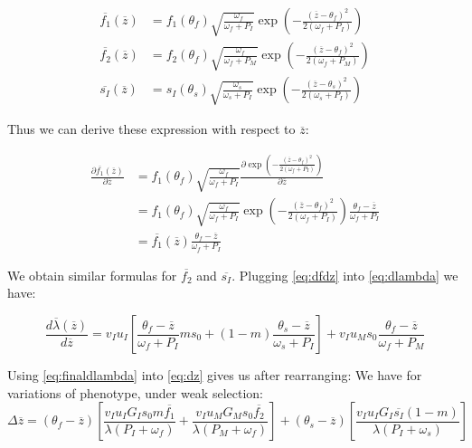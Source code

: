 \begin{subequations}
	\begin{align}
	\label{eq:meanf}
		\overline{f_{1}}(\overline{z}) &= f_{1}(\theta_{f}) \sqrt{\frac{\omega_{f}}{\omega_{f} + P_{I}}} \exp\left(-\frac{(\overline{z}-\theta_{f})^2}{2(\omega_{f}+P_{I})}\right) \\
		\overline{f_{2}}(\overline{z}) &= f_{2}(\theta_{f}) \sqrt{\frac{\omega_{f}}{\omega_{f} + P_{M}}} \exp\left(-\frac{(\overline{z}-\theta_{f})^2}{2(\omega_{f}+P_{M})}\right) \\
		\overline{s_{I}}(\overline{z}) &= s_{I}(\theta_{s}) \sqrt{\frac{\omega_{s}}{\omega_{s} + P_{I}}} \exp\left(-\frac{(\overline{z}-\theta_{s})^2}{2(\omega_{s}+P_{I})}\right)
	\end{align}
\end{subequations}

Thus we can derive these expression with respect to $\overline{z}$:

\begin{align}
	\label{eq:dfdz}
	\frac{\partial \overline{f_{1}}(\overline{z}) }{ \partial \overline{z} } &= f_{1}(\theta_{f}) \sqrt{\frac{\omega_{f}}{\omega_{f} + P_{I}}} \frac{\partial \exp \left(-\frac{(\overline{z}-\theta_{f})^2}{2(\omega_{f}+P_{I})}\right)}{\partial\overline{z}} \nonumber \\
	&= f_{1}(\theta_{f}) \sqrt{ \frac{\omega_{f}}{ \omega_{f} + P_{I}}}\exp\left(-\frac{(\overline{z}-\theta_{f})^2}{2(\omega_{f}+P_{I})}\right) \frac{\theta_{f} - \overline{z}}{\omega_{f} + P_{I}} \nonumber \\
	&= \overline{f_{1}}(\overline{z}) \frac{\theta_{f} - \overline{z}}{\omega_{f} + P_{I}}
\end{align}

We obtain similar formulas for $\overline{f_{2}}$ and $\overline{s_{I}}$. Plugging \eqref{eq:dfdz} into \eqref{eq:dlambda} we have:

\begin{equation}
	\label{eq:finaldlambda}
	\frac{d\overline{\lambda}(\overline{z})}{d\overline{z}} = v_{I} u_{I} \left[ \frac{\theta_{f} - \overline{z}}{\omega_{f} + P_{I}} m s_{0} + (1-m) \frac{\theta_{s} - \overline{z}}{\omega_{s} + P_{I}} \right] + v_{I} u_{M} s_{0} \frac{\theta_{f} - \overline{z} }{\omega_{f} + P_{M}}
\end{equation}

Using \eqref{eq:finaldlambda} into \eqref{eq:dz} gives us after rearranging:
We have for variations of phenotype, under weak selection:
\begin{equation}
	\label{eq:cstdeltaz}
	\Delta\overline{z} = 
		(\theta_{f} - \overline{z})
		\left[ \frac{ v_{I} u_{I} G_{I} s_{0} m \overline{f_{1}} }{ \lambda (P_{I}+\omega_{f}) }
			+ \frac{ v_{I} u_{M} G_{M} s_{0} \overline{f_{2}} }{ \lambda (P_{M} + \omega_{f}) }
		\right]
		+ (\theta_{s} - \overline{z})
		\left[ \frac{ v_{I} u_{I} G_{I} \overline{s_{I}} (1-m) }{ \lambda (P_{I}+\omega_{s}) }
		\right]
\end{equation}

